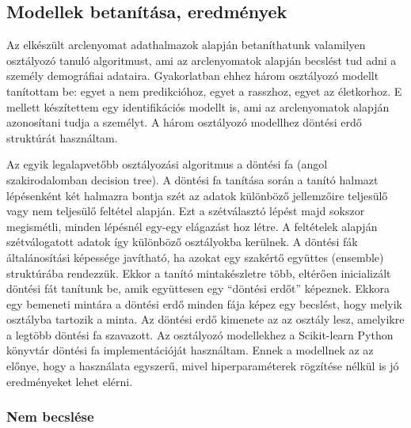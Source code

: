 \subsection{Modellek betanítása, eredmények} %


Az elkészült arclenyomat adathalmazok alapján betaníthatunk valamilyen osztályozó tanuló algoritmust, ami az arclenyomatok alapján becslést tud adni a személy demográfiai adataira. Gyakorlatban ehhez három osztályozó modellt tanítottam be: egyet a nem predikcióhoz, egyet a rasszhoz, egyet az életkorhoz. E mellett készítettem egy identifikációs modellt is, ami az arclenyomatok alapján azonosítani tudja a személyt. A három osztályozó modellhez döntési erdő struktúrát használtam.

Az egyik legalapvetőbb osztályozási algoritmus a döntési fa (angol szakirodalomban decision tree). A döntési fa tanítása során a tanító halmazt lépésenként két halmazra bontja szét az adatok különböző jellemzőire teljesülő vagy nem teljesülő feltétel alapján. Ezt a szétválasztó lépést majd sokszor megismétli, minden lépésnél egy-egy elágazást hoz létre. A feltételek alapján szétválogatott adatok így különböző osztályokba kerülnek. A döntési fák általánosítási képessége javítható, ha azokat egy szakértő együttes (ensemble) struktúrába rendezzük. Ekkor a tanító mintakészletre több, eltérően inicializált döntési fát tanítunk be, amik együttesen egy ``döntési erdőt'' képeznek. Ekkora egy bemeneti mintára a döntési erdő minden fája képez egy becslést, hogy melyik osztályba tartozik a minta. Az döntési erdő kimenete az az osztály lesz, amelyikre a legtöbb döntési fa szavazott. Az osztályozó modellekhez a Scikit-learn Python könyvtár döntési fa implementációját használtam. Ennek a modellnek az az előnye, hogy a használata egyszerű, mivel hiperparaméterek rögzítése nélkül is jó eredményeket lehet elérni.

\subsubsection*{Nem becslése}

